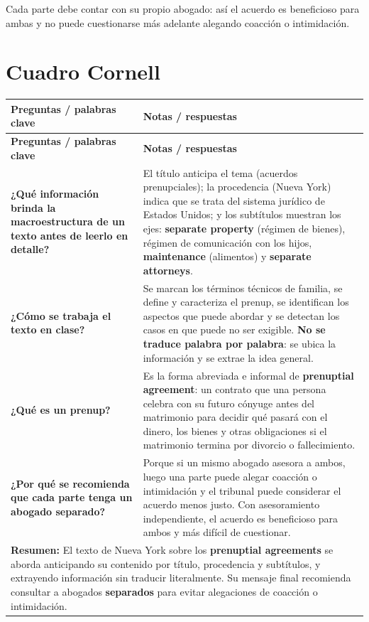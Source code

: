 \documentclass[12pt,oneside]{book}
\newlength{\cornL}
\newlength{\cornR}
\newlength{\cornW}
\begin{document}
\begin{important}
Cada parte debe contar con su propio abogado: así el acuerdo es beneficioso para ambas y no puede cuestionarse más adelante alegando coacción o intimidación.
\end{important}

\section{Cuadro Cornell}

\begin{longtable}{@{}p{\cornL}|p{\cornR}@{}}
\toprule
\textbf{Preguntas / palabras clave} & \textbf{Notas / respuestas} \\
\midrule
\endfirsthead
\toprule
\textbf{Preguntas / palabras clave} & \textbf{Notas / respuestas} \\
\midrule
\endhead
\bottomrule
\endfoot
\bottomrule
\endlastfoot

\textbf{¿Qué información brinda la macroestructura de un texto antes de leerlo en detalle?} &
El título anticipa el tema (acuerdos prenupciales); la procedencia (Nueva York) indica que se trata del sistema jurídico de Estados Unidos; y los subtítulos muestran los ejes: \textbf{separate property} (régimen de bienes), régimen de comunicación con los hijos, \textbf{maintenance} (alimentos) y \textbf{separate attorneys}. \\[0.6em]

\textbf{¿Cómo se trabaja el texto en clase?} &
Se marcan los términos técnicos de familia, se define y caracteriza el prenup, se identifican los aspectos que puede abordar y se detectan los casos en que puede no ser exigible. \textbf{No se traduce palabra por palabra}: se ubica la información y se extrae la idea general. \\[0.6em]

\textbf{¿Qué es un prenup?} &
Es la forma abreviada e informal de \textbf{prenuptial agreement}: un contrato que una persona celebra con su futuro cónyuge antes del matrimonio para decidir qué pasará con el dinero, los bienes y otras obligaciones si el matrimonio termina por divorcio o fallecimiento. \\[0.6em]

\textbf{¿Por qué se recomienda que cada parte tenga un abogado separado?} &
Porque si un mismo abogado asesora a ambos, luego una parte puede alegar coacción o intimidación y el tribunal puede considerar el acuerdo menos justo. Con asesoramiento independiente, el acuerdo es beneficioso para ambos y más difícil de cuestionar. \\[0.6em]

\midrule
\multicolumn{2}{p{\cornW}}{%
\textbf{Resumen:} El texto de Nueva York sobre los \textbf{prenuptial agreements} se aborda anticipando su contenido por título, procedencia y subtítulos, y extrayendo información sin traducir literalmente. Su mensaje final recomienda consultar a abogados \textbf{separados} para evitar alegaciones de coacción o intimidación.
} \\
\end{longtable}
\end{document}
